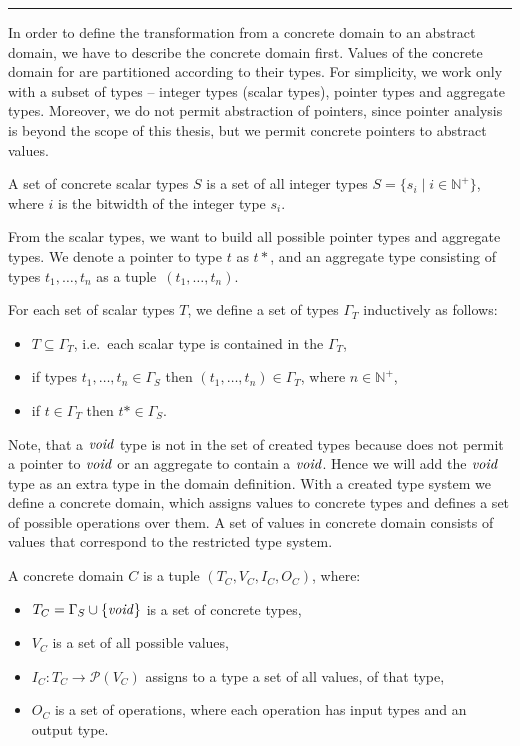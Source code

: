 \hrule

\bigskip

In order to define the transformation from a concrete domain to an abstract
domain, we have to describe the concrete domain first. Values of the concrete
domain for \LLVM are partitioned according to their types. For simplicity, we
work only with a subset of \LLVM types -- integer types (scalar types), pointer
types and aggregate types. Moreover, we do not permit abstraction of pointers,
since pointer analysis is beyond the scope of this thesis, but we permit
concrete pointers to abstract values.
\begin{definition}
A set of concrete scalar types $S$ is a set of all integer types $S = \{
s_i \mid i \in \mathbb{N}^+ \}$, where $i$ is the bitwidth of the integer type
$s_i$.
\end{definition}
From the scalar types, we want to build all possible pointer types and
aggregate types. We denote a pointer to type $t$ as $t*$, and an aggregate type
consisting of types $t_1, \dots, t_n$ as a tuple~$(t_1, \dots, t_n)$.

\begin{definition}
    For each set of scalar types $T$, we define a set of types $\Gamma_T$
    inductively as follows:
    \begin{itemize}
        \item $T \subseteq \Gamma_T$, i.e.~each scalar type is contained in the
            $\Gamma_T$,
        \item if types $t_1, \dots, t_n \in \Gamma_S$ then
            $(t_1, \dots, t_n) \in \Gamma_T$, where $n \in \mathbb{N}^+$,
        \item if $t \in \Gamma_T$ then $t* \in \Gamma_S$.
    \end{itemize}
\end{definition}
Note, that a $\mathit{void}$ type is not in the set of created types because \LLVM does
not permit a pointer to $\mathit{void}$ or an aggregate to contain a $\mathit{void}$. Hence we
will add the $\mathit{void}$ type as an extra type in the domain definition. With a
created type system we define a concrete domain, which assigns values to
concrete types and defines a set of possible operations over them. A set of
values in concrete domain consists of \LLVM values that correspond to the
restricted type system.
\begin{definition}
    A concrete domain $C$ is a tuple $(T_C, V_C, I_C, O_C)$, where:
    \begin{itemize}
        \item $T_C = \Gamma_S \cup \{ \mathit{void} \}$ is a set of concrete types,
        \item $V_C$ is a set of all possible \LLVM values,
        \item $I_C \colon T_C \to \mathcal{P}(V_C)$ assigns to a type a set of
            all values, of that type,
        \item $O_C$ is a set of \LLVM operations, where each operation has
            input types and an output type.
    \end{itemize}
\end{definition}

